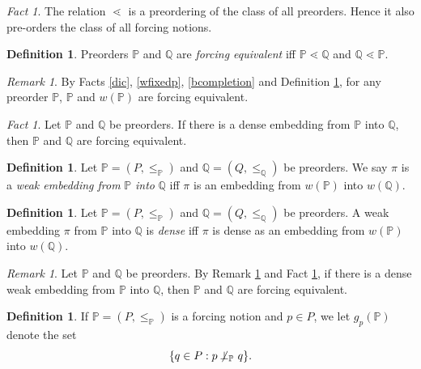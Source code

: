 \documentclass[12pt, twoside]{memoir}
\numberwithin{equation}{section}
\theoremstyle{definition}
\newtheorem{defi}[thm]{Definition}
\theoremstyle{remark}
\newtheorem{rem}[thm]{Remark}
\newtheorem{fact}[thm]{Fact}
\theoremstyle{definition}
\theoremstyle{definition}
\theoremstyle{definition}
\theoremstyle{remark}
\begin{document}
\begin{fact}\label{forpre}
The relation $\lessdot$ is a preordering of the class of all preorders. Hence it also pre-orders the class of all forcing notions.
\end{fact}

\begin{defi}\label{comdef}
Preorders $\mathbb{P}$ and $\mathbb{Q}$ are \emph{forcing equivalent} iff $\mathbb{P} \lessdot \mathbb{Q}$ and $\mathbb{Q} \lessdot \mathbb{P}$.
\end{defi}

\begin{rem}\label{sepeq}
By Facts \ref{dic}, \ref{wfixedp}, \ref{bcompletion} and Definition \ref{comdef}, for any preorder $\mathbb{P}$, $\mathbb{P}$ and $w(\mathbb{P})$ are forcing equivalent.
\end{rem}

\begin{fact}\label{defor}
Let $\mathbb{P}$ and $\mathbb{Q}$ be preorders. If there is a dense embedding from $\mathbb{P}$ into $\mathbb{Q}$, then $\mathbb{P}$ and $\mathbb{Q}$ are forcing equivalent.
\end{fact}

\begin{defi}
Let $\mathbb{P} = (P, \leq_{\mathbb{P}})$ and $\mathbb{Q} = (Q, \leq_{\mathbb{Q}})$ be preorders. We say $\pi$ is a \emph{weak embedding from} $\mathbb{P}$ \emph{into} $\mathbb{Q}$ iff $\pi$ is an embedding from $w(\mathbb{P})$ into $w(\mathbb{Q})$.
\end{defi}

\begin{defi}
Let $\mathbb{P} = (P, \leq_{\mathbb{P}})$ and $\mathbb{Q} = (Q, \leq_{\mathbb{Q}})$ be preorders. A weak embedding $\pi$ from $\mathbb{P}$ into $\mathbb{Q}$ is \emph{dense} iff $\pi$ is dense as an embedding from $w(\mathbb{P})$ into $w(\mathbb{Q})$.
\end{defi}

\begin{rem}\label{dwefor}
Let $\mathbb{P}$ and $\mathbb{Q}$ be preorders. By Remark \ref{sepeq} and Fact \ref{defor}, if there is a dense weak embedding from $\mathbb{P}$ into $\mathbb{Q}$, then $\mathbb{P}$ and $\mathbb{Q}$ are forcing equivalent.
\end{rem}

\begin{defi}
If $\mathbb{P} = (P, \leq_{\mathbb{P}})$ is a forcing notion and $p \in P$, we let $g_p (\mathbb{P})$ denote the set $$\{q \in P : p \not \! \! \bot_{\mathbb{P}} \ q\}.$$
\end{defi}
\end{document}
